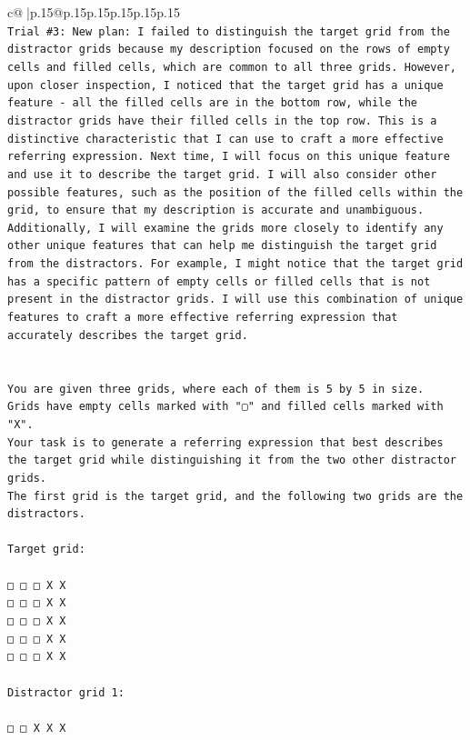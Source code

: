 \documentclass{article}
\begin{document}
{\begin{supertabular}{c@{$\;$}|p{.15\linewidth}@{}p{.15\linewidth}p{.15\linewidth}p{.15\linewidth}p{.15\linewidth}p{.15\linewidth}}
{{{\\ 
\texttt{Trial \#3: New plan: I failed to distinguish the target grid from the distractor grids because my description focused on the rows of empty cells and filled cells, which are common to all three grids. However, upon closer inspection, I noticed that the target grid has a unique feature {-} all the filled cells are in the bottom row, while the distractor grids have their filled cells in the top row. This is a distinctive characteristic that I can use to craft a more effective referring expression. Next time, I will focus on this unique feature and use it to describe the target grid. I will also consider other possible features, such as the position of the filled cells within the grid, to ensure that my description is accurate and unambiguous. Additionally, I will examine the grids more closely to identify any other unique features that can help me distinguish the target grid from the distractors. For example, I might notice that the target grid has a specific pattern of empty cells or filled cells that is not present in the distractor grids. I will use this combination of unique features to craft a more effective referring expression that accurately describes the target grid.} \\
\\ 
\\ 
\texttt{You are given three grids, where each of them is 5 by 5 in size.} \\
\texttt{Grids have empty cells marked with "▢" and filled cells marked with "X".} \\
\texttt{Your task is to generate a referring expression that best describes the target grid while distinguishing it from the two other distractor grids.} \\
\texttt{The first grid is the target grid, and the following two grids are the distractors.} \\
\\ 
\texttt{Target grid:} \\
\\ 
\texttt{□ □ □ X X} \\
\texttt{□ □ □ X X} \\
\texttt{□ □ □ X X} \\
\texttt{□ □ □ X X} \\
\texttt{□ □ □ X X} \\
\\ 
\texttt{Distractor grid 1:} \\
\\ 
\texttt{□ □ X X X} \\
}}}
\end{supertabular}}
\end{document}
